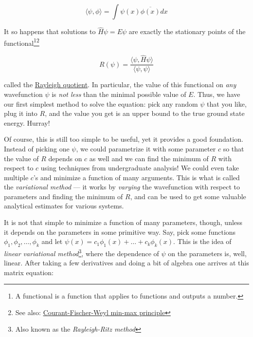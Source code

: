 \documentclass{article}
\begin{document}
\begin{equation} \label{eq:l2prod} \langle \psi, \phi \rangle = \int \psi(x) \overline{\phi(x)} dx \end{equation}

It so happens\textsuperscript{\cite{ref:atkins}} that solutions to \(\hat H \psi = E \psi\) are exactly the stationary points of the functional\footnote{A functional is a function that applies to functions and outputs a number.}\footnote{See also: \href{https://en.wikipedia.org/wiki/Min-max_theorem\#Self-adjoint_operators}{Courant-Fischer-Weyl min-max principle}}

\begin{equation} \label{eq:rayleigh} R(\psi) = \frac{\langle \psi, \hat H \psi \rangle}{\langle \psi, \psi \rangle} \end{equation}

called the \href{https://en.wikipedia.org/wiki/Rayleigh_quotient}{Rayleigh quotient}. In particular, the value of this functional on \textit{any} wavefunction \(\psi\) is \textit{not less} than the minimal possible value of \(E\). Thus, we have our first simplest method to solve the equation: pick any random \(\psi\) that you like, plug it into \(R\), and the value you get is an upper bound to the true ground state energy. Hurray!

Of course, this is still too simple to be useful, yet it provides a good foundation. Instead of picking one \(\psi\), we could parametrize it with some parameter \(c\) so that the value of \(R\) depends on \(c\) as well and we can find the minimum of \(R\) with respect to \(c\) using techniques from undergraduate analysis!\textsuperscript{\cite{ref:atkins}} We could even take multiple \(c\)'s and minimize a function of many arguments. This is what is called the \textit{variational method} --- it works by \textit{varying} the wavefunction with respect to parameters and finding the minimum of \(R\), and can be used to get some valuable analytical estimates for various systems\textsuperscript{\cite{ref:atkins}}.

It is not that simple to minimize a function of many parameters, though, unless it depends on the parameters in some primitive way. Say, pick some functions \(\phi_1, \phi_2, \dots, \phi_k\) and let \(\psi(x) = c_1 \phi_1(x) + \dots + c_k \phi_k(x) \). This is the idea of \textit{linear variational method}\footnote{Also known as the \textit{Rayleigh-Ritz method}}, where the dependence of \(\psi\) on the parameters is, well, linear. After taking a few derivatives and doing a bit of algebra one arrives\textsuperscript{\cite{ref:atkins}} at this matrix equation:
\end{document}
